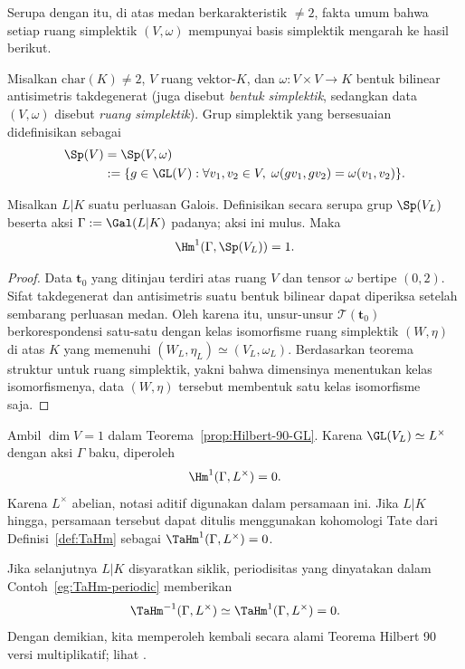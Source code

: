 Serupa dengan itu, di atas medan berkarakteristik $\neq2$, fakta umum bahwa
setiap ruang simplektik $(V,\omega)$ mempunyai basis simplektik mengarah ke
hasil berikut.

\begin{theorem}
	Misalkan $\mathrm{char}(K)\neq2$, $V$ ruang vektor-$K$, dan
	$\omega:V\times V\to K$ bentuk bilinear antisimetris takdegenerat (juga
	disebut \emph{bentuk simplektik}, sedangkan data $(V,\omega)$ disebut
	\emph{ruang simplektik}). Grup simplektik yang bersesuaian didefinisikan
	sebagai
	\begin{align*}
		\Sp(V)&=\Sp(V,\omega)\\
		&:=\{g\in\GL(V):\forall v_1,v_2\in V,\;
		\omega(gv_1,gv_2)=\omega(v_1,v_2)\}.
	\end{align*}

	Misalkan $L|K$ suatu perluasan Galois. Definisikan secara serupa grup
	$\Sp(V_L)$ beserta aksi $\Gamma:=\Gal(L|K)$ padanya; aksi ini mulus. Maka
	\[
	\Hm^1(\Gamma,\Sp(V_L))=1.
	\]
\end{theorem}
\begin{proof}
	Data $\mathbf{t}_0$ yang ditinjau terdiri atas ruang $V$ dan tensor
	$\omega$ bertipe $(0,2)$. Sifat takdegenerat dan antisimetris suatu bentuk
	bilinear dapat diperiksa setelah sembarang perluasan medan. Oleh karena itu,
	unsur-unsur $\mathscr{T}(\mathbf{t}_0)$ berkorespondensi satu-satu dengan
	kelas isomorfisme ruang simplektik $(W,\eta)$ di atas $K$ yang memenuhi
	$(W_L,\eta_L)\simeq(V_L,\omega_L)$. Berdasarkan teorema struktur untuk
	ruang simplektik, yakni bahwa dimensinya menentukan kelas isomorfismenya,
	data $(W,\eta)$ tersebut membentuk satu kelas isomorfisme saja.
\end{proof}

\begin{example}\label{eg:multiplicative-90-finite}
	Ambil $\dim V=1$ dalam Teorema~\ref{prop:Hilbert-90-GL}. Karena
	$\GL(V_L)\simeq L^\times$ dengan aksi $\Gamma$ baku, diperoleh
	\[
	\Hm^1(\Gamma,L^\times)=0.
	\]
	Karena $L^\times$ abelian, notasi aditif digunakan dalam persamaan ini.
	Jika $L|K$ hingga, persamaan tersebut dapat ditulis menggunakan kohomologi
	Tate dari Definisi~\ref{def:TaHm} sebagai
	$\TaHm^1(\Gamma,L^\times)=0$.

	Jika selanjutnya $L|K$ disyaratkan siklik, periodisitas yang dinyatakan
	dalam Contoh~\ref{eg:TaHm-periodic} memberikan
	\[
	\TaHm^{-1}(\Gamma,L^\times)
	\simeq\TaHm^1(\Gamma,L^\times)=0.
	\]
	Dengan demikian, kita memperoleh kembali secara alami Teorema Hilbert 90
	versi multiplikatif; lihat \cite[Teorema 9.6.9]{Li1}.
\end{example}


